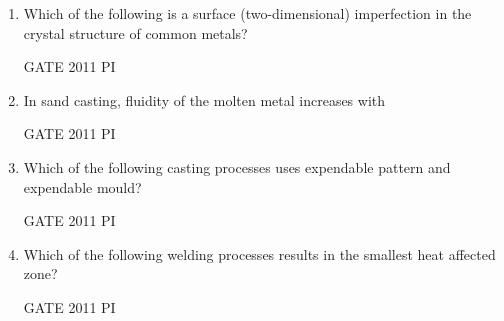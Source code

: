 \documentclass[journal,12pt,onecolumn]{IEEEtran}
\theoremstyle{remark}
\begin{document}
\begin{enumerate}
\item Which of the following is a surface (two-dimensional) imperfection in the crystal structure of common metals?  

\hfill GATE 2011 PI  

\begin{enumerate}
\end{enumerate}

\item In sand casting, fluidity of the molten metal increases with  

\hfill GATE 2011 PI  

\begin{enumerate}
\end{enumerate}

\item Which of the following casting processes uses expendable pattern and expendable mould?  

\hfill GATE 2011 PI  

\begin{enumerate}
\end{enumerate}

\item Which of the following welding processes results in the smallest heat affected zone?  

\hfill GATE 2011 PI  


\end{enumerate}
\end{document}
